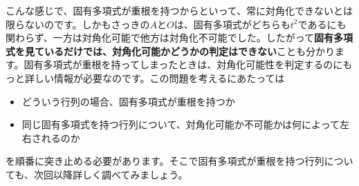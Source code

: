 こんな感じで、固有多項式が重根を持つからといって、常に対角化できないとは限らないのです。しかもさっきの$A$と$O$は、固有多項式がどちらも$t^2$であるにも関わらず、一方は対角化可能で他方は対角化不可能でした。したがって\textbf{固有多項式を見ているだけでは、対角化可能かどうかの判定はできない}ことも分かります。固有多項式が重根を持ってしまったときは、対角化可能性を判定するのにもっと詳しい情報が必要なのです。この問題を考えるにあたっては
\begin{itemize}
\item どういう行列の場合、固有多項式が重根を持つか
\item 同じ固有多項式を持つ行列について、対角化可能か不可能かは何によって左右されるのか
\end{itemize}
を順番に突き止める必要があります。そこで固有多項式が重根を持つ行列についても、次回以降詳しく調べてみましょう。

